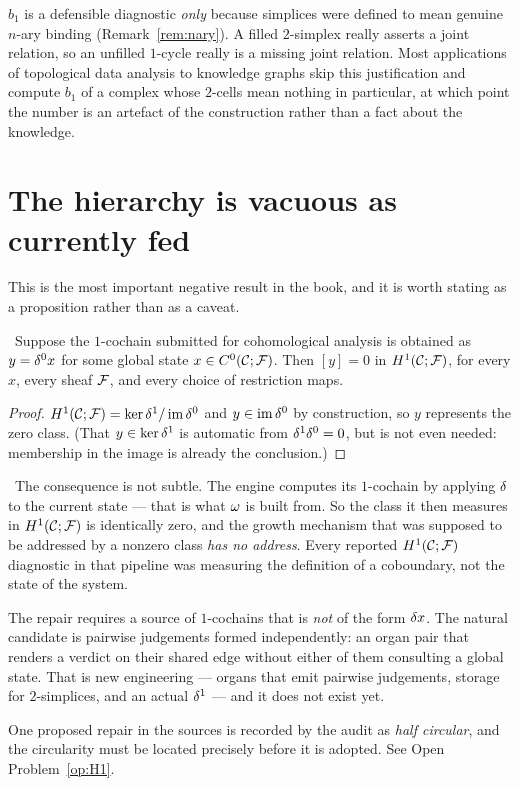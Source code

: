 \begin{remark}\label{rem:b1earned}
$b_1$ is a defensible diagnostic \emph{only} because simplices were
defined to mean genuine $n$-ary binding
(Remark~\ref{rem:nary}). A filled $2$-simplex really asserts a joint
relation, so an unfilled $1$-cycle really is a missing joint relation.
Most applications of topological data analysis to knowledge graphs skip
this justification and compute $b_1$ of a complex whose $2$-cells mean
nothing in particular, at which point the number is an artefact of the
construction rather than a fact about the knowledge.
\end{remark}

\section{The hierarchy is vacuous as currently fed}

This is the most important negative result in the book, and it is worth
stating as a proposition rather than as a caveat.

\begin{proposition}\label{prop:vacuous}
\Proved\ Suppose the $1$-cochain submitted for cohomological analysis is
obtained as $y=\delta^0 x$ for some global state $x\in C^{0}(\mathcal{C};\mathcal{F})$. Then
$[y]=0$ in $H^{1}(\mathcal{C};\mathcal{F})$, for every $x$, every sheaf $\mathcal{F}$, and every choice
of restriction maps.
\end{proposition}
\begin{proof}
$H^{1}(\mathcal{C};\mathcal{F})=\ker\delta^1/\operatorname{im}\delta^0$ and $y\in\operatorname{im}\delta^0$ by construction, so
$y$ represents the zero class. (That $y\in\ker\delta^1$ is automatic from
$\delta^1\delta^0=0$, but is not even needed: membership in the image is
already the conclusion.)
\end{proof}

\begin{hon}\Hon
\Refuted\ The consequence is not subtle. The engine computes its
$1$-cochain by applying $\delta$ to the current state --- that is what
$\omega$ is built from. So the class it then measures in $H^{1}(\mathcal{C};\mathcal{F})$ is
identically zero, and the growth mechanism that was supposed to be
addressed by a nonzero class \emph{has no address}. Every reported
$H^{1}(\mathcal{C};\mathcal{F})$ diagnostic in that pipeline was measuring the definition of a
coboundary, not the state of the system.

The repair requires a source of $1$-cochains that is \emph{not} of the
form $\delta x$. The natural candidate is pairwise judgements formed
independently: an organ pair that renders a verdict on their shared
edge without either of them consulting a global state. That is new
engineering --- organs that emit pairwise judgements, storage for
$2$-simplices, and an actual $\delta^1$ --- and it does not exist yet.

One proposed repair in the sources is recorded by the audit as
\emph{half circular}, and the circularity must be located precisely
before it is adopted. See Open Problem~\ref{op:H1}.
\end{hon}


